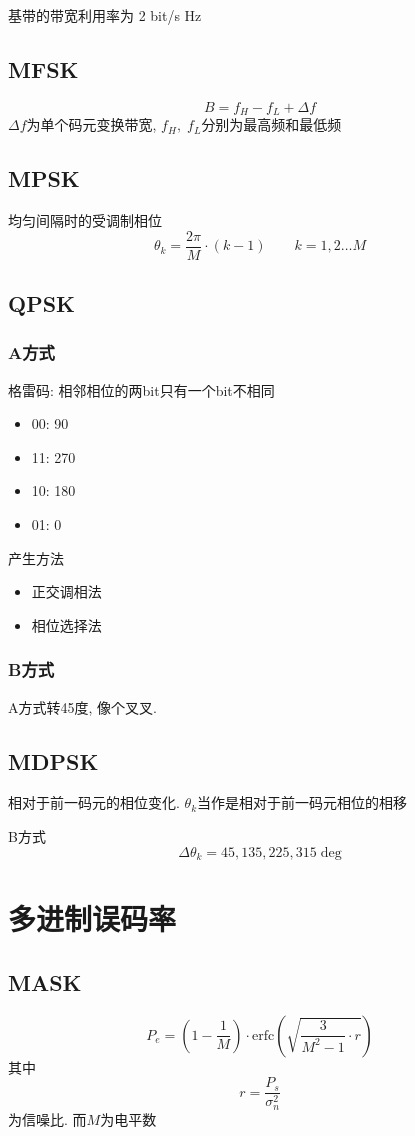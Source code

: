 \documentclass[a4paper]{report}
\begin{document}
基带的带宽利用率为 2 bit/s Hz
\subsection{MFSK}
\begin{equation}
  B=f_{H}-f_L+\Delta f
\end{equation}
$\Delta f$为单个码元变换带宽, $f_H,\; f_L$分别为最高频和最低频
\subsection{MPSK}
均匀间隔时的受调制相位
\begin{equation}
  \theta_k=\frac{2\pi}{M}\cdot (k-1)\qquad k=1,2\dots M
\end{equation}
\subsection{QPSK}
\subsubsection{A方式}
格雷码: 相邻相位的两bit只有一个bit不相同
\begin{itemize}
  \item 00: 90
  \item 11: 270
  \item 10: 180
  \item 01: 0
\end{itemize}
产生方法
\begin{itemize}
  \item 正交调相法
  \item 相位选择法
\end{itemize}
\subsubsection{B方式}
A方式转45度, 像个叉叉. 
\subsection{MDPSK}
相对于前一码元的相位变化. $\theta_k$当作是相对于前一码元相位的相移

B方式$$\Delta \theta_k=45,135,225,315 \; \text{deg}$$
\section{多进制误码率}
\subsection{MASK}
\begin{equation}
  P_e=(1-\frac{1}{M})\cdot \text{erfc}(\sqrt{\frac{3}{M^2-1}\cdot r})
\end{equation}
其中\begin{equation}
  r=\frac{P_s}{\sigma_n^2}
\end{equation}为信噪比. 而$M$为电平数
\end{document}
